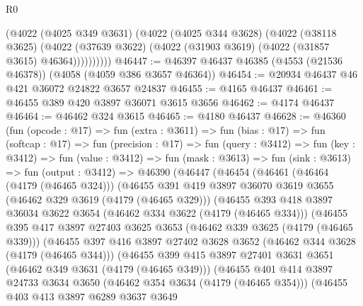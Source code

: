 \begin{lexlean}{R0}
\begin{coremodule}
            (@4022
              (@4025 @349 @3631)
              (@4022
                (@4025 @344 @3628)
                (@4022
                  (@38118 @3625)
                  (@4022 (@37639 @3622) (@4022 (@31903 @3619) (@4022 (@31857 @3615) @46364))))))))))
@46447 := @46397 @46437 @46385 (@4553 (@21536 @46378)) (@4058 (@4059 @386 @3657 @46364))
@46454 := @20934 @46437 @46 @421 @36072 @24822 @3657 @24837
@46455 := @4165 @46437
@46461 := @46455 @389 @420 @3897 @36071 @3615 @3656
@46462 := @4174 @46437
@46464 := @46462 @324 @3615
@46465 := @4180 @46437
@46628 := @46360
    (fun (opcode : @17) =>
    fun (extra : @3611) =>
    fun (bias : @17) =>
    fun (softcap : @17) =>
    fun (precision : @17) =>
    fun (query : @3412) =>
    fun (key : @3412) =>
    fun (value : @3412) =>
    fun (mask : @3613) =>
    fun (sink : @3613) =>
    fun (output : @3412) =>
    @46390
      (@46447
        (@46454
          (@46461
            (@46464 (@4179 (@46465 @324)))
            (@46455
              @391
              @419
              @3897
              @36070
              @3619
              @3655
              (@46462 @329 @3619 (@4179 (@46465 @329)))
              (@46455
                @393
                @418
                @3897
                @36034
                @3622
                @3654
                (@46462 @334 @3622 (@4179 (@46465 @334)))
                (@46455
                  @395
                  @417
                  @3897
                  @27403
                  @3625
                  @3653
                  (@46462 @339 @3625 (@4179 (@46465 @339)))
                  (@46455
                    @397
                    @416
                    @3897
                    @27402
                    @3628
                    @3652
                    (@46462 @344 @3628 (@4179 (@46465 @344)))
                    (@46455
                      @399
                      @415
                      @3897
                      @27401
                      @3631
                      @3651
                      (@46462 @349 @3631 (@4179 (@46465 @349)))
                      (@46455
                        @401
                        @414
                        @3897
                        @24733
                        @3634
                        @3650
                        (@46462 @354 @3634 (@4179 (@46465 @354)))
                        (@46455
                          @403
                          @413
                          @3897
                          @6289
                          @3637
                          @3649

\end{coremodule}
\end{lexlean}
